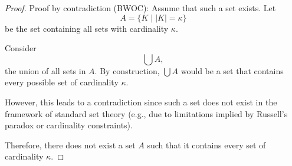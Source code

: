 \begin{proof}
    Proof by contradiction (BWOC): Assume that such a set exists. Let 
    \[ 
    A = \{ K \mid |K| = \kappa \} 
    \]
    be the set containing all sets with cardinality $\kappa$.

    Consider 
    \[
    \bigcup A,
    \]
    the union of all sets in $A$. By construction, $\bigcup A$ would be a set that contains every possible set of cardinality $\kappa$.

    However, this leads to a contradiction since such a set does not exist in the framework of standard set theory (e.g., due to limitations implied by Russell's paradox or cardinality constraints).

    Therefore, there does not exist a set $A$ such that it contains every set of cardinality $\kappa$.
\end{proof}

